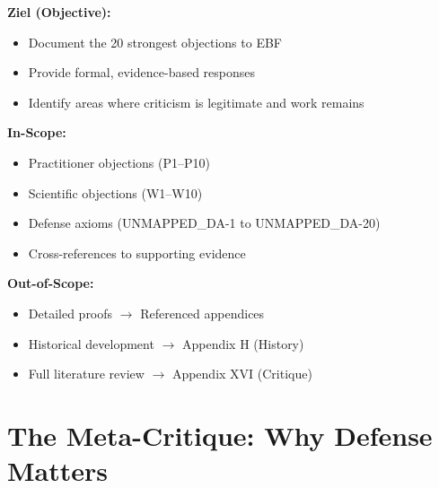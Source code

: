 \begin{tcolorbox}[
    colback=orange!5!white,
    colframe=orange!75!black,
    title={\textbf{Appendix Scope: Critical Defense}},
    fonttitle=\bfseries
]

\textbf{Ziel (Objective):}
\begin{itemize}[nosep]
    \item Document the 20 strongest objections to EBF
    \item Provide formal, evidence-based responses
    \item Identify areas where criticism is legitimate and work remains
\end{itemize}

\textbf{In-Scope:}
\begin{itemize}[nosep]
    \item Practitioner objections (P1--P10)
    \item Scientific objections (W1--W10)
    \item Defense axioms (UNMAPPED_DA-1 to UNMAPPED_DA-20)
    \item Cross-references to supporting evidence
\end{itemize}

\textbf{Out-of-Scope:}
\begin{itemize}[nosep]
    \item Detailed proofs $\rightarrow$ Referenced appendices
    \item Historical development $\rightarrow$ Appendix H (History)
    \item Full literature review $\rightarrow$ Appendix XVI (Critique)
\end{itemize}

\end{tcolorbox}

\section{The Meta-Critique: Why Defense Matters}
\label{sec:da-meta}

